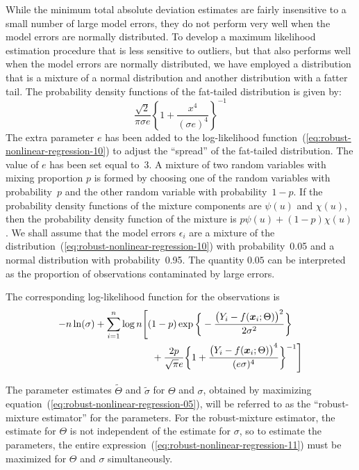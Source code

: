 \documentclass{admbmanual}
\begin{document}
While the minimum total absolute deviation estimates are fairly
insensitive to a small number of large  model errors, they
do not perform very well when the model errors are normally distributed.
To develop a maximum likelihood estimation
procedure that is less sensitive to outliers, but that
also performs well when the model errors are normally distributed,
 we have employed a distribution that is a 
mixture of a normal
distribution and another distribution with  a fatter tail.
The probability density functions of the fat-tailed distribution is given by: 
\begin{equation}\label{eq:robust-nonlinear-regression-10} %
  \frac{\sqrt{2}}{\pi\sigma e}\left\{1+\frac{x^4}{{(\sigma e)}^4}\right\}^{-1}
\end{equation}
The extra parameter $e$ has been added to the log-likelihood function~(\ref{eq:robust-nonlinear-regression-10}) %
to adjust the ``spread'' of the
fat-tailed distribution. The value of $e$ has been set equal to~3.
A mixture of two random variables with mixing proportion $p$ is
formed by choosing one of the random variables with probability~$p$
and the other random variable with probability~$1-p$. If the
probability density functions of the mixture components
are $\psi(u)$ and $\chi(u)$, then the probability density function
of the mixture is $p\psi(u)+(1-p)\chi(u)$.
We shall assume that the model errors $\epsilon_i$ are a mixture 
of the distribution~(\ref{eq:robust-nonlinear-regression-10}) %
with probability~0.05
and a normal distribution with probability~0.95.
The quantity $0.05$ can be interpreted as the
proportion of observations contaminated by large errors.  

The corresponding log-likelihood function for the observations is 
\begin{align}\label{eq:robust-nonlinear-regression-11} %
\nonumber  -n\ln(\sigma)+\sum_{i=1}^n \log n
  & \Bigg[%
    (1-p)\exp                          \bigg\{-\frac{\big(Y_i-f({\mbox{\boldmath $x$}}_i;\Theta)\big)^2}{2\sigma^2}\bigg\} \\ 
     & \quad +  \frac{2p}{\sqrt{\pi} e}   \bigg\{1+\frac{\big(Y_i-f({\mbox{\boldmath $x$}}_i;\Theta)\big)^4
     }{(e\sigma)^4}\bigg\}^{-1}
  \Bigg]
\end{align}

The parameter estimates $\widetilde\Theta$ and $\tilde\sigma$ for $\Theta$
and $\sigma$, obtained by maximizing equation~(\ref{eq:robust-nonlinear-regression-05}), %
will
be referred to as the ``robust-mixture estimator'' for the parameters. 
For the robust-mixture estimator, the estimate for $\Theta$
is not independent of the estimate
for $\sigma$, so to estimate the parameters, the entire
expression~(\ref{eq:robust-nonlinear-regression-11}) %
must be maximized for $\Theta$ and $\sigma$ simultaneously.
\end{document}

